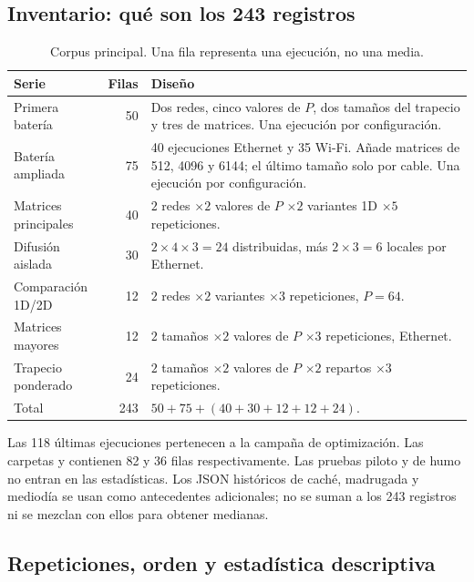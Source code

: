 \subsection{Inventario: qué son los 243 registros}

\begin{table}[H]\centering\small
\caption{Corpus principal. Una fila representa una ejecución, no una media.}
\begin{tabularx}{\linewidth}{p{3.2cm}rX}
\toprule Serie & Filas & Diseño \\
\midrule
Primera batería & 50 & Dos redes, cinco valores de $P$, dos tamaños del trapecio y tres de matrices. Una ejecución por configuración. \\
Batería ampliada & 75 & 40 ejecuciones Ethernet y 35 Wi-Fi. Añade matrices de 512, 4096 y 6144; el último tamaño solo por cable. Una ejecución por configuración. \\
Matrices principales & 40 & $2$ redes $\times2$ valores de $P$ $\times2$ variantes 1D $\times5$ repeticiones. \\
Difusión aislada & 30 & $2\times4\times3=24$ distribuidas, más $2\times3=6$ locales por Ethernet. \\
Comparación 1D/2D & 12 & $2$ redes $\times2$ variantes $\times3$ repeticiones, $P=64$. \\
Matrices mayores & 12 & $2$ tamaños $\times2$ valores de $P$ $\times3$ repeticiones, Ethernet. \\
Trapecio ponderado & 24 & $2$ tamaños $\times2$ valores de $P$ $\times2$ repartos $\times3$ repeticiones. \\
\midrule Total & 243 & $50+75+(40+30+12+12+24)$. \\
\bottomrule
\end{tabularx}
\end{table}

Las 118 últimas ejecuciones pertenecen a la campaña de optimización. Las carpetas  y  contienen 82 y 36 filas respectivamente. Las pruebas piloto y de humo no entran en las estadísticas. Los JSON históricos de caché, madrugada y mediodía se usan como antecedentes adicionales; no se suman a los 243 registros ni se mezclan con ellos para obtener medianas.

\subsection{Repeticiones, orden y estadística descriptiva}

